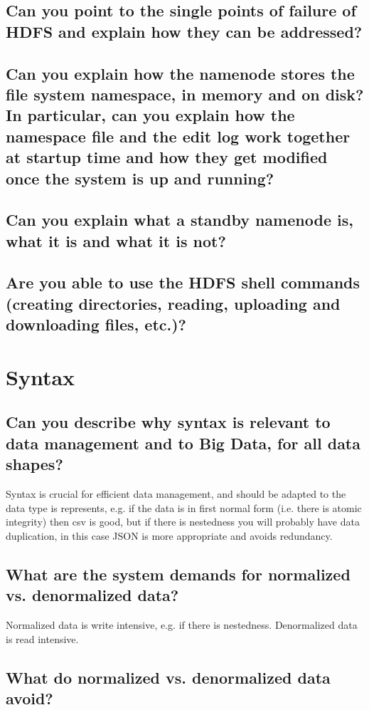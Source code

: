 \documentclass{article}
\begin{document}
\subsection{Can you point to the single points of failure of HDFS and explain how they can be addressed?}
\subsection{Can you explain how the namenode stores the file system namespace, in memory and on disk? In particular, can you explain how the namespace file and the edit log work together at startup time and how they get modified once the system is up and running?}
\subsection{Can you explain what a standby namenode is, what it is and what it is not?}
\subsection{Are you able to use the HDFS shell commands (creating directories, reading, uploading and downloading files, etc.)?}

\pagebreak

\section{Syntax}
\subsection{Can you describe why syntax is relevant to data management and to Big Data, for all data shapes?}

Syntax is crucial for efficient data management, and should be adapted to the data type is represents, e.g. if the data is in first normal form (i.e. there is atomic integrity) then csv is good, but if there is nestedness you will probably have data duplication, in this case JSON is more appropriate and avoids redundancy.

\subsection{What are the system demands for normalized vs. denormalized data?}

Normalized data is write intensive, e.g. if there is nestedness. Denormalized data is read intensive.

\subsection{What do normalized vs. denormalized data avoid?}
\end{document}
